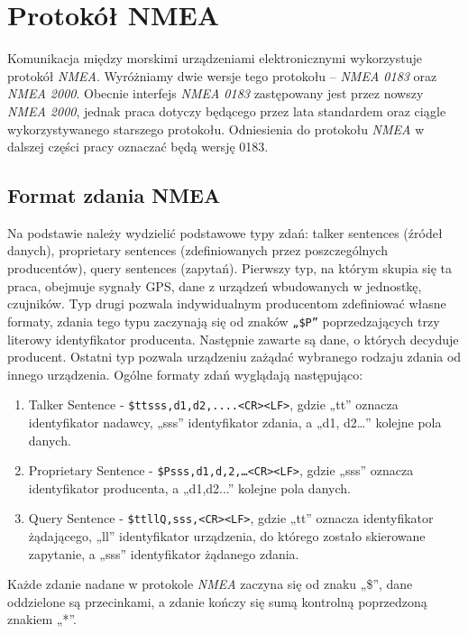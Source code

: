 \documentclass[skorowidz,skroty]{dyplomWEZUT}
\begin{document}


\chapter{Protokół NMEA}\label{chap:NMEA protocol}

Komunikacja między morskimi urządzeniami elektronicznymi wykorzystuje protokół \textit{NMEA}. Wyróżniamy dwie wersje tego protokołu – \textit{NMEA 0183} oraz \textit{NMEA 2000}. Obecnie interfejs \textit{NMEA 0183} zastępowany jest przez nowszy \textit{NMEA 2000}, jednak praca dotyczy będącego przez lata standardem oraz ciągle wykorzystywanego starszego protokołu. Odniesienia do protokołu \textit{NMEA} w dalszej części pracy oznaczać będą wersję 0183. 

\section{Format zdania NMEA}\label{sec:format nmea}

Na podstawie \cite{NMEA0183} należy wydzielić podstawowe typy zdań: talker sentences (źródeł danych), proprietary sentences (zdefiniowanych przez poszczególnych producentów), query sentences (zapytań). Pierwszy typ, na którym skupia się ta praca, obejmuje sygnały GPS,  dane z urządzeń wbudowanych w jednostkę, czujników. Typ drugi pozwala indywidualnym producentom zdefiniować własne formaty, zdania tego typu zaczynają się od znaków \texttt{„\$P”} poprzedzających trzy literowy identyfikator producenta. Następnie zawarte są dane, o których decyduje producent. Ostatni typ pozwala urządzeniu zażądać wybranego rodzaju zdania od innego urządzenia. Ogólne formaty zdań wyglądają następująco:
\begin{enumerate}
\item Talker Sentence - \texttt{\$ttsss,d1,d2,....<CR><LF>}, gdzie „tt” oznacza identyfikator nadawcy, „sss” identyfikator zdania, a „d1, d2…” kolejne pola danych. 
\item Proprietary Sentence - \texttt{\$Psss,d1,d,2,…<CR><LF>}, gdzie „sss” oznacza identyfikator producenta, a „d1,d2...” kolejne pola danych.
\item Query Sentence - \texttt{\$ttllQ,sss,<CR><LF>}, gdzie „tt” oznacza identyfikator żądającego, „ll” identyfikator urządzenia, do którego zostało skierowane zapytanie, a „sss” identyfikator żądanego zdania.
\end{enumerate}
Każde zdanie nadane w protokole \textit{NMEA} zaczyna się od znaku „\$”, dane oddzielone są przecinkami, a zdanie kończy się sumą kontrolną poprzedzoną znakiem „*”.
\end{document}
